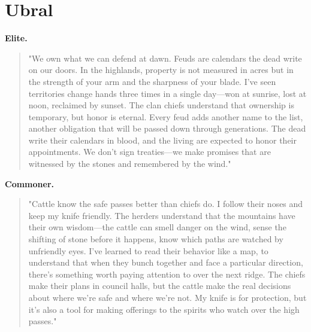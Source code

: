 \section*{Ubral}
\textbf{Elite.}
\begin{quote}
"We own what we can defend at dawn. Feuds are calendars the dead write on our doors. In the highlands, property is not measured in acres but in the strength of your arm and the sharpness of your blade. I've seen territories change hands three times in a single day—won at sunrise, lost at noon, reclaimed by sunset. The clan chiefs understand that ownership is temporary, but honor is eternal. Every feud adds another name to the list, another obligation that will be passed down through generations. The dead write their calendars in blood, and the living are expected to honor their appointments. We don't sign treaties—we make promises that are witnessed by the stones and remembered by the wind."
\end{quote}
\textbf{Commoner.}
\begin{quote}
"Cattle know the safe passes better than chiefs do. I follow their noses and keep my knife friendly. The herders understand that the mountains have their own wisdom—the cattle can smell danger on the wind, sense the shifting of stone before it happens, know which paths are watched by unfriendly eyes. I've learned to read their behavior like a map, to understand that when they bunch together and face a particular direction, there's something worth paying attention to over the next ridge. The chiefs make their plans in council halls, but the cattle make the real decisions about where we're safe and where we're not. My knife is for protection, but it's also a tool for making offerings to the spirits who watch over the high passes."
\end{quote}

